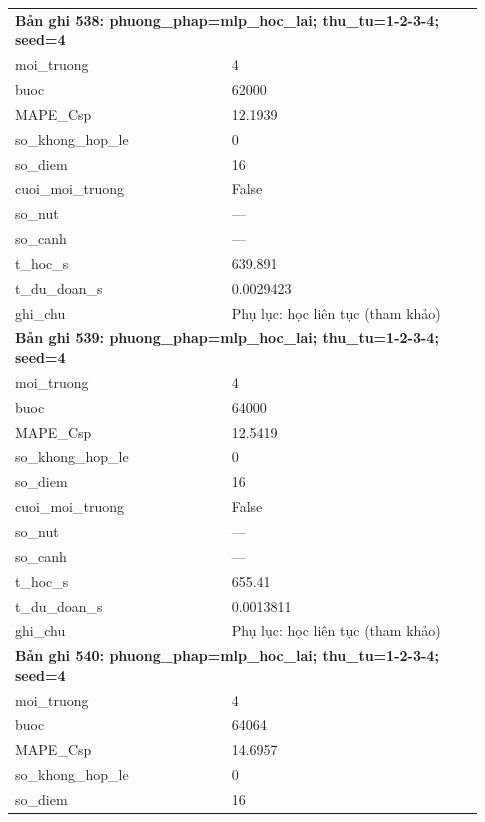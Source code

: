 \begin{longtable}{p{0.43\linewidth}p{0.50\linewidth}}
\midrule
\multicolumn{2}{p{0.95\linewidth}}{\textbf{Bản ghi 538: phuong\_phap=mlp\_hoc\_lai; thu\_tu=1-2-3-4; seed=4}} \\
moi\_\allowbreak truong & 4 \\
buoc & 62000 \\
MAPE\_\allowbreak Csp & 12.1939 \\
so\_\allowbreak khong\_\allowbreak hop\_\allowbreak le & 0 \\
so\_\allowbreak diem & 16 \\
cuoi\_\allowbreak moi\_\allowbreak truong & False \\
so\_\allowbreak nut & — \\
so\_\allowbreak canh & — \\
t\_\allowbreak hoc\_\allowbreak s & 639.891 \\
t\_\allowbreak du\_\allowbreak doan\_\allowbreak s & 0.0029423 \\
ghi\_\allowbreak chu & Phụ lục: học liên tục (tham khảo) \\
\midrule
\multicolumn{2}{p{0.95\linewidth}}{\textbf{Bản ghi 539: phuong\_phap=mlp\_hoc\_lai; thu\_tu=1-2-3-4; seed=4}} \\
moi\_\allowbreak truong & 4 \\
buoc & 64000 \\
MAPE\_\allowbreak Csp & 12.5419 \\
so\_\allowbreak khong\_\allowbreak hop\_\allowbreak le & 0 \\
so\_\allowbreak diem & 16 \\
cuoi\_\allowbreak moi\_\allowbreak truong & False \\
so\_\allowbreak nut & — \\
so\_\allowbreak canh & — \\
t\_\allowbreak hoc\_\allowbreak s & 655.41 \\
t\_\allowbreak du\_\allowbreak doan\_\allowbreak s & 0.0013811 \\
ghi\_\allowbreak chu & Phụ lục: học liên tục (tham khảo) \\
\midrule
\multicolumn{2}{p{0.95\linewidth}}{\textbf{Bản ghi 540: phuong\_phap=mlp\_hoc\_lai; thu\_tu=1-2-3-4; seed=4}} \\
moi\_\allowbreak truong & 4 \\
buoc & 64064 \\
MAPE\_\allowbreak Csp & 14.6957 \\
so\_\allowbreak khong\_\allowbreak hop\_\allowbreak le & 0 \\
so\_\allowbreak diem & 16 \\

\end{longtable}
